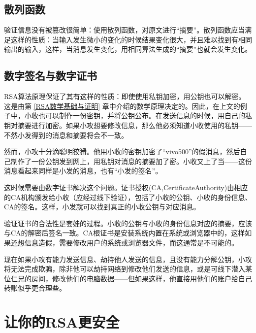\documentclass[a4paper]{article}         %
\begin{document}
\subsection{散列函数} \label{散列函数}

验证信息没有被篡改很简单：使用散列函数，对原文进行“摘要”。散列函数应当满足这样的性质：当输入发生微小的变化的时候结果变化很大，并且难以找到有相同输出的输入，这样，当消息发生变化，用相同算法生成的“摘要”也就会发生变化。

\subsection{数字签名与数字证书}

RSA算法原理保证了其有这样的性质：即使使用私钥加密，用公钥也可以解密。这是由第 \ref{RSA数学基础与证明} 章中介绍的数学原理决定的。因此，在上文的例子中，小收也可以制作一份密钥，并将公钥公布。在发送信息的时候，用自己的私钥对摘要进行加密。如果小攻想要修改信息，那么他必须知道小收使用的私钥——不然小发得到的消息和摘要将会不一致。

然而，小攻十分滴聪明狡猾。他用小收的密钥加密了“vivo500”的假消息，然后自己制作了一份公钥发到网上，用私钥对消息的摘要加了密。小收又上了当——这份消息看起来同样是小发的消息，也有“小发的签名”。

这时候需要由数字证书解决这个问题。证书授权(CA,CertificateAuthority)由相应的CA机构颁发给小收（应经过线下验证），包括了小收的公钥、小收的身份信息、CA的签名。这样，小发就可以找到真正的小收公钥与对应消息。

验证证书的合法性是套娃的过程。小收的公钥与小收的身份信息对应的摘要，应该与CA的解密后签名一致。CA根证书是安装系统内置在系统或浏览器中的，这样如果还想信息造假，需要修改用户的系统或浏览器文件，而这通常是不可能的。

现在如果小攻有能力发送信息、劫持他人发送的信息，且没有能力分解公钥，小攻将无法完成欺骗，除非他可以劫持网络到修改他们发送的信息，或是可线下潜入某位仁兄的房间，修改他们的电脑数据——但如果这样，他直接用他们的账户给自己转账似乎更合理些。

\section{让你的RSA更安全}




\end{document}

